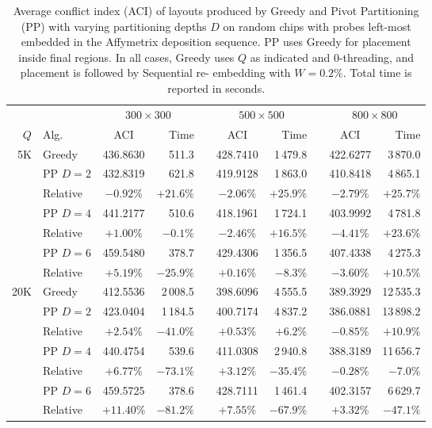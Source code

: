 \begin{table}[t!]\centering
\caption{\label{tab:pp_async_ci}
  Average conflict index (ACI) of layouts produced by Greedy and Pivot
  Partitioning (PP) with varying partitioning depths $D$ on random chips with
  probes left-most embedded in the Affymetrix deposition sequence. PP uses
  Greedy for placement inside final regions. In all cases, Greedy uses $Q$ as
  indicated and $0$-threading, and placement is followed by Sequential
  re- embedding with $W=0.2\%$. Total time is reported in seconds.}
\footnotesize{
\begin{tabular}{rlcrlcrlcr}
\vspace{1pt}
 & & \multicolumn{2}{c}{$300\times 300$} & & \multicolumn{2}{c}{$500\times 500$} & & \multicolumn{2}{c}{$800\times 800$} \\
\cline{3-4} \cline{6-7} \cline{9-10}
\vspace{1pt}
$Q$ & Alg.     & ACI      & Time       & & ACI      & Time       & & ACI      & Time        \\
\hline
 5K & Greedy   & 436.8630 &    511.3   & & 428.7410 & 1\,479.8   & & 422.6277 &  3\,870.0   \\
\cline{2-10}
    & PP $D=2$ & 432.8319 &    621.8   & & 419.9128 & 1\,863.0   & & 410.8418 &  4\,865.1   \\
    & Relative & $-0.92\%$&   $+21.6\%$& & $-2.06\%$&   $+25.9\%$& & $-2.79\%$&    $+25.7\%$\\
\cline{2-10}
    & PP $D=4$ & 441.2177 &    510.6   & & 418.1961 & 1\,724.1   & & 403.9992 &  4\,781.8   \\
    & Relative & $+1.00\%$&    $-0.1\%$& & $-2.46\%$&   $+16.5\%$& & $-4.41\%$&    $+23.6\%$\\
\cline{2-10}
    & PP $D=6$ & 459.5480 &    378.7   & & 429.4306 & 1\,356.5   & & 407.4338 &  4\,275.3   \\
    & Relative & $+5.19\%$&   $-25.9\%$& & $+0.16\%$&    $-8.3\%$& & $-3.60\%$&    $+10.5\%$\\
\hline
20K & Greedy   & 412.5536 & 2\,008.5   & & 398.6096 & 4\,555.5   & & 389.3929 & 12\,535.3   \\
\cline{2-10}
    & PP $D=2$ & 423.0404 & 1\,184.5   & & 400.7174 & 4\,837.2   & & 386.0881 & 13\,898.2   \\
    & Relative & $+2.54\%$&   $-41.0\%$& & $+0.53\%$&    $+6.2\%$& & $-0.85\%$&    $+10.9\%$\\
\cline{2-10}
    & PP $D=4$ & 440.4754 &    539.6   & & 411.0308 & 2\,940.8   & & 388.3189 & 11\,656.7   \\
    & Relative & $+6.77\%$&   $-73.1\%$& & $+3.12\%$&   $-35.4\%$& & $-0.28\%$&     $-7.0\%$\\
\cline{2-10}
    & PP $D=6$ & 459.5725 &    378.6   & & 428.7111 & 1\,461.4   & & 402.3157 &  6\,629.7   \\
    & Relative &$+11.40\%$&   $-81.2\%$& & $+7.55\%$&   $-67.9\%$& & $+3.32\%$&    $-47.1\%$\\
\hline
\end{tabular}}
\end{table}

